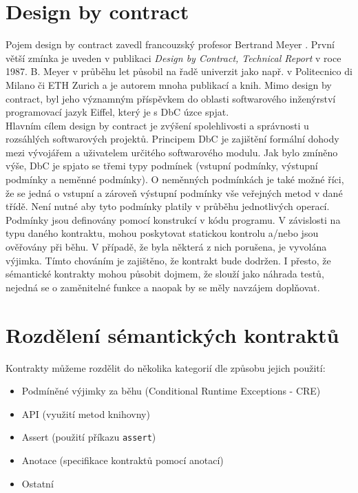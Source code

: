 	\section{Design by contract}
		Pojem design by contract zavedl francouzský profesor Bertrand Meyer \cite{meyerBio}\cite{eiffelStudio}. První větší zmínka je uveden v publikaci \emph{Design by Contract, Technical Report} v roce 1987. B. Meyer v průběhu let působil na řadě univerzit jako např. v Politecnico di Milano či ETH Zurich a je autorem mnoha publikací a knih. Mimo design by contract, byl jeho významným příspěvkem do oblasti softwarového inženýrství programovací jazyk Eiffel, který je s DbC úzce spjat.\\	
	
		Hlavním cílem design by contract je zvýšení spolehlivosti a správnosti u rozsáhlých softwarových projektů. Principem DbC je zajištění formální dohody mezi vývojářem a uživatelem určitého softwarového modulu. Jak bylo zmíněno výše, DbC je spjato se třemi typy podmínek (vstupní podmínky, výstupní podmínky a neměnné podmínky). O neměnných podmínkách je také možné říci, že se jedná o vstupní a zároveň výstupní podmínky vše veřejných metod v dané třídě. Není nutné aby tyto podmínky platily v průběhu jednotlivých operací.\\
	
	Podmínky jsou definovány pomocí konstrukcí v kódu programu. V závislosti na typu daného kontraktu, mohou poskytovat statickou kontrolu a/nebo jsou ověřovány při běhu. V případě, že byla některá z nich porušena, je vyvolána výjimka. Tímto chováním je zajištěno, že kontrakt bude dodržen. I přesto, že sémantické kontrakty mohou působit dojmem, že slouží jako náhrada testů, nejedná se o zaměnitelné funkce a naopak by se měly navzájem doplňovat.	
	
	
	\section{Rozdělení sémantických kontraktů}
		Kontrakty můžeme rozdělit do několika kategorií dle způsobu jejich použití:
			
		\begin{itemize}
			\item Podmíněné výjimky za běhu (Conditional Runtime Exceptions - CRE)
			\item API (využití metod knihovny)
			\item Assert (použití příkazu \texttt{assert})
			\item Anotace (specifikace kontraktů pomocí anotací)
			\item Ostatní
		\end{itemize}				
		
